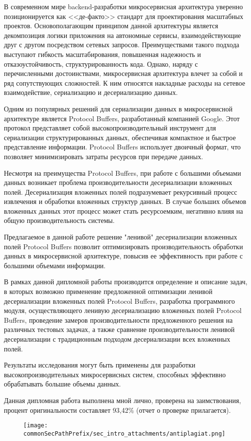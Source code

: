 
В современном мире backend-разработки микросервисная архитектура уверенно позиционируется как <<де-факто>> стандарт для проектирования масштабных проектов. Основополагающим принципом данной архитектуры является декомпозиция логики приложения на автономные сервисы, взаимодействующие друг с другом посредством сетевых запросов. Преимуществами такого подхода выступают гибкость масштабирования, повышенная надежность и отказоустойчивость, структурированность кода.
Однако, наряду с перечисленными достоинствами, микросервисная архитектура влечет за собой и ряд сопутствующих сложностей. К ним относятся накладные расходы на сетевое взаимодействие, сериализацию и десериализацию данных.

Одним из популярных решений для сериализации данных в микросервисной архитектуре является Protocol Buffers, разработанный компанией Google. Этот протокол представляет собой высокопроизводительный инструмент для сериализации структурированных данных, обеспечивая компактное и быстрое представление информации. Protocol Buffers использует двоичный формат, что позволяет минимизировать затраты ресурсов при передаче данных.

Несмотря на преимущества Protocol Buffers, при работе с большими объемами данных возникает проблема производительности десериализации вложенных полей. Десериализация вложенных полей подразумевает рекурсивный процесс извлечения и обработки вложенных структур данных. В случае больших объемов вложенных данных этот процесс может стать ресурсоемким, негативно влияя на общую производительность системы.

Предлагаемое в данной работе решение "ленивой" десериализации вложенных полей Protocol Buffers позволит оптимизировать производительность обработки данных в микросервисной архитектуре, повысив ее эффективность при работе с большими объемами информации.

В рамках данной дипломной работы производится определение и описание задач, в которых возможно применение предложенной оптимизации ленивой десериализации вложенных полей Protocol Buffers, разработка программного модуля, осуществляющего ленивую десериализацию вложенных полей Protocol Buffers, проведение замеров производительности предложенного решения на различных тестовых задачах, а также сравнение производительности ленивой десериализации с традиционным подходом десериализации всех вложенных полей.

Результаты исследования могут быть применены для разработки высокопроизводительных микросервисных систем, способных эффективно обрабатывать большие объемы данных.

Данная дипломная работа выполнена мной лично, проверена на заимствования, процент оригинальности составляет 93,42\% (отчет о проверке прилагается).

\begin{figure}[H]
    \centering
    \texttt{[image: \\commonSecPathPrefix/sec\_intro\_attachments/antiplagiat.png]}
\end{figure}
